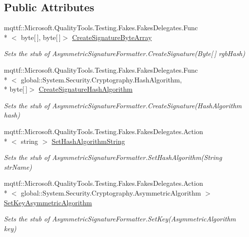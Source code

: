 \subsection*{Public Attributes}
\begin{DoxyCompactItemize}
\item 
mqttf\-::\-Microsoft.\-Quality\-Tools.\-Testing.\-Fakes.\-Fakes\-Delegates.\-Func\\*
$<$ byte\mbox{[}$\,$\mbox{]}, byte\mbox{[}$\,$\mbox{]}$>$ \hyperlink{class_system_1_1_security_1_1_cryptography_1_1_fakes_1_1_stub_asymmetric_signature_formatter_a251c1cb3173d7967d882eb087f32c6e3}{Create\-Signature\-Byte\-Array}
\begin{DoxyCompactList}\small\item\em Sets the stub of Asymmetric\-Signature\-Formatter.\-Create\-Signature(\-Byte\mbox{[}$\,$\mbox{]} rgb\-Hash)\end{DoxyCompactList}\item 
mqttf\-::\-Microsoft.\-Quality\-Tools.\-Testing.\-Fakes.\-Fakes\-Delegates.\-Func\\*
$<$ global\-::\-System.\-Security.\-Cryptography.\-Hash\-Algorithm, \\*
byte\mbox{[}$\,$\mbox{]}$>$ \hyperlink{class_system_1_1_security_1_1_cryptography_1_1_fakes_1_1_stub_asymmetric_signature_formatter_adbd4efbac540ebbb4c994f772dd46c0f}{Create\-Signature\-Hash\-Algorithm}
\begin{DoxyCompactList}\small\item\em Sets the stub of Asymmetric\-Signature\-Formatter.\-Create\-Signature(\-Hash\-Algorithm hash)\end{DoxyCompactList}\item 
mqttf\-::\-Microsoft.\-Quality\-Tools.\-Testing.\-Fakes.\-Fakes\-Delegates.\-Action\\*
$<$ string $>$ \hyperlink{class_system_1_1_security_1_1_cryptography_1_1_fakes_1_1_stub_asymmetric_signature_formatter_afbfe186c7d3733c51c5a0116abd2fb29}{Set\-Hash\-Algorithm\-String}
\begin{DoxyCompactList}\small\item\em Sets the stub of Asymmetric\-Signature\-Formatter.\-Set\-Hash\-Algorithm(\-String str\-Name)\end{DoxyCompactList}\item 
mqttf\-::\-Microsoft.\-Quality\-Tools.\-Testing.\-Fakes.\-Fakes\-Delegates.\-Action\\*
$<$ global\-::\-System.\-Security.\-Cryptography.\-Asymmetric\-Algorithm $>$ \hyperlink{class_system_1_1_security_1_1_cryptography_1_1_fakes_1_1_stub_asymmetric_signature_formatter_aec9e454bed744850ce7767ddace03d63}{Set\-Key\-Asymmetric\-Algorithm}
\begin{DoxyCompactList}\small\item\em Sets the stub of Asymmetric\-Signature\-Formatter.\-Set\-Key(\-Asymmetric\-Algorithm key)\end{DoxyCompactList}\end{DoxyCompactItemize}
